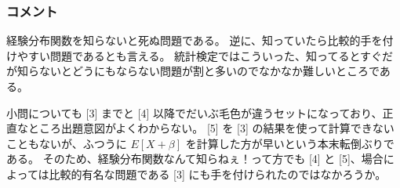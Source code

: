 \documentclass[./main.tex]{subfiles}
\begin{document}
    \subsubsection*{コメント}
    経験分布関数を知らないと死ぬ問題である。
    逆に、知っていたら比較的手を付けやすい問題であるとも言える。
    統計検定ではこういった、知ってるとすぐだが知らないとどうにもならない問題が割と多いのでなかなか難しいところである。

    小問についても [3] までと [4] 以降でだいぶ毛色が違うセットになっており、正直なところ出題意図がよくわからない。
    [5] を [3] の結果を使って計算できないこともないが、ふつうに $E[X + \beta]$ を計算した方が早いという本末転倒ぶりである。
    そのため、経験分布関数なんて知らねぇ！って方でも [4] と [5]、場合によっては比較的有名な問題である [3] にも手を付けられたのではなかろうか。
\end{document}
